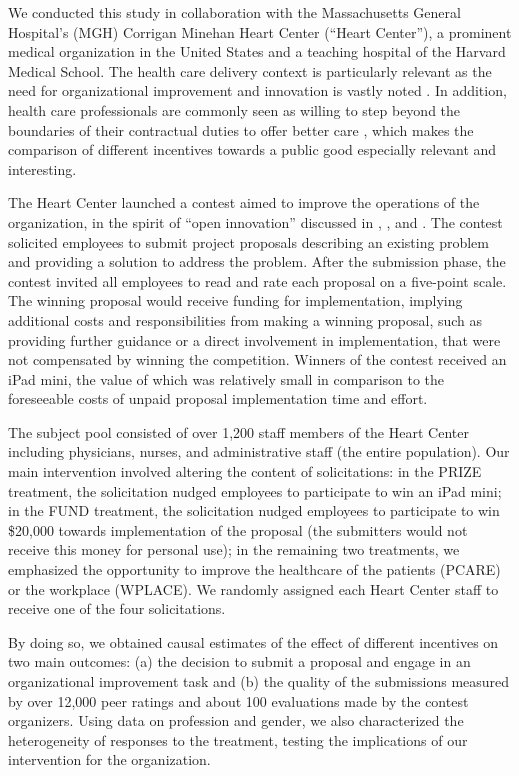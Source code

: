 \documentclass[12pt, titlepage]{article}
\begin{document}
We conducted this study in collaboration with the Massachusetts General
Hospital's (MGH) Corrigan Minehan Heart Center (``Heart Center''), a
prominent medical organization in the United States and a teaching
hospital of the Harvard Medical School. The health care delivery context
is particularly relevant as the need for organizational improvement and
innovation is vastly noted \citep[e.g.,][]{cutler2012reducing}. In
addition, health care professionals are commonly seen as willing to step
beyond the boundaries of their contractual duties to offer better care
\citep{delfgaauw2005dedicated}, which makes the comparison of different
incentives towards a public good especially relevant and interesting.

The Heart Center launched a contest aimed to improve the operations of
the organization, in the spirit of ``open innovation'' discussed in
\citet{terwiesch2008innovation}, \citet{lakhani2013prize}, and
\citet{glaeser2016predictive}. The contest solicited employees to submit
project proposals describing an existing problem and providing a
solution to address the problem. After the submission phase, the contest
invited all employees to read and rate each proposal on a five-point
scale. The winning proposal would receive funding for implementation,
implying additional costs and responsibilities from making a winning
proposal, such as providing further guidance or a direct involvement in
implementation, that were not compensated by winning the competition.
Winners of the contest received an iPad mini, the value of which was
relatively small in comparison to the foreseeable costs of unpaid
proposal implementation time and effort.

The subject pool consisted of over 1,200 staff members of the Heart
Center including physicians, nurses, and administrative staff (the
entire population). Our main intervention involved altering the content
of solicitations: in the PRIZE treatment, the solicitation nudged
employees to participate to win an iPad mini; in the FUND treatment, the
solicitation nudged employees to participate to win \$20,000 towards
implementation of the proposal (the submitters would not receive this
money for personal use); in the remaining two treatments, we emphasized
the opportunity to improve the healthcare of the patients (PCARE) or the
workplace (WPLACE). We randomly assigned each Heart Center staff to
receive one of the four solicitations.

By doing so, we obtained causal estimates of the effect of different
incentives on two main outcomes: (a) the decision to submit a proposal
and engage in an organizational improvement task and (b) the quality of
the submissions measured by over 12,000 peer ratings and about 100
evaluations made by the contest organizers. Using data on profession and
gender, we also characterized the heterogeneity of responses to the
treatment, testing the implications of our intervention for the
organization.
\end{document}
